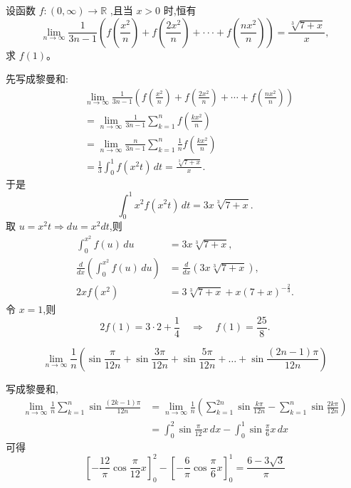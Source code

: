 \begin{questions}
    \question 设函数 $f:(0,\infty)\rightarrow\mathbb{R}$ ,且当 $x>0$ 时,恒有
    \[
    \lim_{n\rightarrow\infty}\frac{1}{3n-1}\left(f\left(\frac{x^{2}}{n}\right)+f\left(\frac{2x^{2}}{n}\right)+\cdot\cdot\cdot+f\left(\frac{nx^{2}}{n}\right)\right)=\frac{\sqrt[3]{7+x}}{x},
    \]
    求 $f(1)$。
    \begin{solution}
        先写成黎曼和:
        \begin{align*}
        &\lim_{n\to\infty} \frac{1}{3n-1} \left( f\left(\frac{x^2}{n}\right) + f\left(\frac{2x^2}{n}\right) + \cdots + f\left(\frac{nx^2}{n}\right) \right) \\
        &= \lim_{n\to \infty} \frac{1}{3n-1} \sum_{k=1}^n f\left(\frac{kx^2}{n}\right) \\
        &= \lim_{n\to \infty} \frac{n}{3n-1} \sum_{k=1}^n \frac{1}{n} f\left(\frac{kx^2}{n}\right) \\
        &= \frac{1}{3} \int_0^1 f(x^2 t)\, dt = \frac{\sqrt[3]{7+x}}{x}.
        \end{align*}
        于是
        \[
        \int_0^1 x^2 f(x^2 t)\, dt = 3x \sqrt[3]{7+x}.
        \]
        取 $u = x^2 t \Rightarrow du = x^2 dt$,则
        \begin{align*}
        \int_0^{x^2} f(u)\, du &= 3x \sqrt[3]{7+x}, \\
        \frac{d}{dx} \left( \int_0^{x^2} f(u)\, du \right) &= \frac{d}{dx} \left( 3x \sqrt[3]{7+x} \right), \\
        2x f(x^2) &= 3 \sqrt[3]{7+x} + x (7+x)^{-\frac{2}{3}}.
        \end{align*}
        令 $x=1$,则
        \[
        2 f(1) = 3\cdot 2 + \frac{1}{4} \quad \Rightarrow \quad f(1) = \frac{25}{8}.
        \]
    \end{solution}

    \question 
    \[
    \lim_{n\to\infty} \frac{1}{n} \left( \sin \frac{\pi}{12n} + \sin \frac{3\pi}{12n} + \sin \frac{5\pi}{12n} + \dots + \sin \frac{(2n-1)\pi}{12n} \right) 
    \]
    \begin{solution}
        写成黎曼和,
        \begin{align*}
        \lim_{n\to \infty} \frac{1}{n} \sum_{k=1}^n \sin \frac{(2k-1)\pi}{12n}
        &= \lim_{n\to \infty} \frac{1}{n} \left( \sum_{k=1}^{2n} \sin \frac{k\pi}{12n} - \sum_{k=1}^{n} \sin \frac{2k\pi}{12n} \right)\\
        &= \int_0^2 \sin \frac{\pi}{12}x \, dx - \int_0^1 \sin \frac{\pi}{6}x \, dx
        \end{align*}
        可得
        \[
        \left[ -\frac{12}{\pi} \cos \frac{\pi}{12}x \right]_0^2 - \left[ -\frac{6}{\pi} \cos \frac{\pi}{6}x \right]_0^1 = \frac{6 - 3\sqrt{3}}{\pi}
        \]
    \end{solution}


\end{questions}
